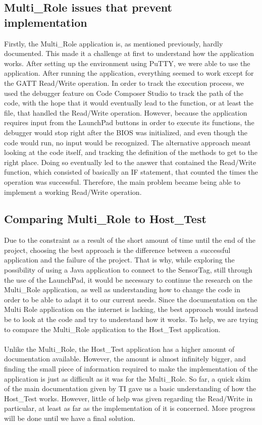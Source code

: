 \documentclass[conference,12pt]{IEEETran}
\begin{document}
\subsection{Multi\_Role issues that prevent implementation}
Firstly, the Multi\_Role application is, as mentioned previously, hardly documented. This made it a challenge at first to understand how the application works. After setting up the environment using PuTTY, we were able to use the application. After running the application, everything seemed to work except for the GATT Read/Write operation. In order to track the execution process, we used the debugger feature on Code Composer Studio to track the path of the code, with the hope that it would eventually lead to the function, or at least the file, that handled the Read/Write operation. However, because the application requires input from the LaunchPad buttons in order to execute its functions, the debugger would stop right after the BIOS was initialized, and even though the code would run, no input would be recognized. The alternative approach meant looking at the code itself, and tracking the definition of the methods to get to the right place. Doing so eventually led to the answer that contained the Read/Write function, which consisted of basically an IF statement, that counted the times the operation was successful. Therefore, the main problem became being able to implement a working Read/Write operation.\\

\subsection{Comparing Multi\_Role to Host\_Test}
Due to the constraint as a result of the short amount of time until the end of the project, choosing the best approach is the difference between a successful application and the failure of the project. That is why, while exploring the possibility of using a Java application to connect to the SensorTag, still through the use of the LaunchPad, it would be necessary to continue the research on the Multi\_Role application, as well as understanding how to change the code in order to be able to adapt it to our current needs. Since the documentation on the Multi Role application on the internet is lacking, the best approach would instead be to look at the code and try to understand how it works. To help, we are trying to compare the Multi\_Role application to the Host\_Test application.\\\\
Unlike the Multi\_Role, the Host\_Test application has a higher amount of documentation available. However, the amount is almost infinitely bigger, and finding the small piece of information required to make the implementation of the application is just as difficult as it was for the Multi\_Role. So far, a quick skim of the main documentation given by TI gave us a basic understanding of how the Host\_Test works. However, little of help was given regarding the Read/Write in particular, at least as far as the implementation of it is concerned. More progress will be done until we have a final solution.\\
\end{document}
